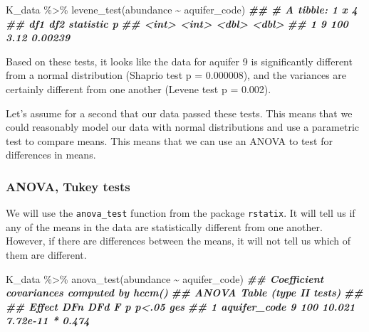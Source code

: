 \documentclass[
]{krantz}
\newenvironment{Shaded}{\begin{snugshade}}{\end{snugshade}}
\newcommand{\DocumentationTok}[1]{\textcolor[rgb]{0.56,0.35,0.01}{\textbf{\textit{#1}}}}
\newcommand{\FunctionTok}[1]{\textcolor[rgb]{0.00,0.00,0.00}{#1}}
\newcommand{\NormalTok}[1]{#1}
\newcommand{\SpecialCharTok}[1]{\textcolor[rgb]{0.00,0.00,0.00}{#1}}
\begin{document}
\begin{Shaded}
\begin{Highlighting}[]
\NormalTok{K\_data }\SpecialCharTok{\%\textgreater{}\%}
  \FunctionTok{levene\_test}\NormalTok{(abundance }\SpecialCharTok{\textasciitilde{}}\NormalTok{ aquifer\_code)}
\DocumentationTok{\#\# \# A tibble: 1 x 4}
\DocumentationTok{\#\#     df1   df2 statistic       p}
\DocumentationTok{\#\#   \textless{}int\textgreater{} \textless{}int\textgreater{}     \textless{}dbl\textgreater{}   \textless{}dbl\textgreater{}}
\DocumentationTok{\#\# 1     9   100      3.12 0.00239}
\end{Highlighting}
\end{Shaded}

Based on these tests, it looks like the data for aquifer 9 is significantly different from a normal distribution (Shaprio test p = 0.000008), and the variances are certainly different from one another (Levene test p = 0.002).

Let's assume for a second that our data passed these tests. This means that we could reasonably model our data with normal distributions and use a parametric test to compare means. This means that we can use an ANOVA to test for differences in means.

\hypertarget{anova-tukey-tests}{%
\subsubsection{ANOVA, Tukey tests}\label{anova-tukey-tests}}

We will use the \texttt{anova\_test} function from the package \texttt{rstatix}. It will tell us if any of the means in the data are statistically different from one another. However, if there are differences between the means, it will not tell us which of them are different.

\begin{Shaded}
\begin{Highlighting}[]
\NormalTok{K\_data }\SpecialCharTok{\%\textgreater{}\%}
  \FunctionTok{anova\_test}\NormalTok{(abundance }\SpecialCharTok{\textasciitilde{}}\NormalTok{ aquifer\_code)}
\DocumentationTok{\#\# Coefficient covariances computed by hccm()}
\DocumentationTok{\#\# ANOVA Table (type II tests)}
\DocumentationTok{\#\# }
\DocumentationTok{\#\#         Effect DFn DFd      F        p p\textless{}.05   ges}
\DocumentationTok{\#\# 1 aquifer\_code   9 100 10.021 7.72e{-}11     * 0.474}
\end{Highlighting}
\end{Shaded}
\end{document}

